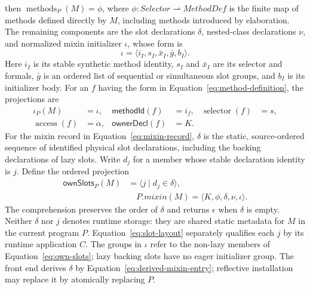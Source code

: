 \documentclass[11pt]{article}
\numberwithin{equation}{section}
\newcommand{\access}{\mathop{\mathrm{access}}}
\newcommand{\selector}{\mathop{\mathrm{selector}}}
\newcommand{\methods}{\mathop{\mathrm{methods}}}
\begin{document}
then $\methods_P(M)=\phi$, where
$\phi:\mathit{Selector}\rightharpoonup\mathit{MethodDef}$ is the finite map
of methods defined directly by $M$, including methods introduced by
elaboration.  The remaining components are the slot declarations $\delta$,
nested-class declarations $\nu$, and normalized mixin initializer
$\iota$, whose form is
\begin{equation}\label{eq:mixin-initializer}
 \iota=\langle i_I,s_I,\bar x_I,\bar g,b_I\rangle.
\end{equation}
Here $i_I$ is its stable
synthetic method identity, $s_I$ and $\bar x_I$ are its selector and formals,
$\bar g$ is an ordered list of sequential or simultaneous slot groups, and
$b_I$ is its initializer body.  For an $f$ having the form in
Equation~\eqref{eq:method-definition}, the projections are
\begin{equation}\label{eq:method-projections}
\begin{aligned}
 \iota_P(M)&=\iota, & \mathsf{methodId}(f)&=i_f,
   & \selector(f)&=s,\\
 \access(f)&=\alpha, & \mathsf{ownerDecl}(f)&=K.
\end{aligned}
\end{equation}
For the mixin record in Equation~\eqref{eq:mixin-record}, $\delta$ is the
static, source-ordered sequence of identified physical slot declarations,
including the backing declarations of lazy slots.  Write $d_j$ for a member
whose stable declaration identity is $j$.  Define the ordered projection
\begin{equation}\label{eq:own-slots}
\begin{aligned}
 \mathsf{ownSlots}_P(M)&=\langle j\mid d_j\in\delta\rangle,\\
 &\quad P.\mathit{mixin}(M)=\langle K,\phi,\delta,\nu,\iota\rangle.
\end{aligned}
\end{equation}
The comprehension preserves the order of $\delta$ and returns $\epsilon$
when $\delta$ is empty.  Neither $\delta$ nor $j$ denotes runtime storage:
they are shared static metadata for $M$ in the current program $P$.
Equation~\eqref{eq:slot-layout} separately qualifies each $j$ by its runtime
application $C$.  The groups in $\iota$ refer to the non-lazy members of
Equation~\eqref{eq:own-slots}; lazy backing slots have no eager initializer
group.  The front end derives $\delta$ by
Equation~\eqref{eq:derived-mixin-entry}; reflective installation may replace
it by atomically replacing $P$.
\end{document}
